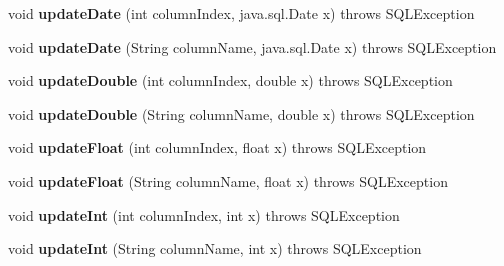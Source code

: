 \begin{DoxyCompactItemize}
void {\bfseries update\+Date} (int column\+Index, java.\+sql.\+Date x)  throws S\+Q\+L\+Exception 
\item 
\mbox{\label{classcom_1_1mysql_1_1cj_1_1jdbc_1_1result_1_1_updatable_result_set_a9d7d6087e923469e0c6c936848aedd4b}} 
void {\bfseries update\+Date} (String column\+Name, java.\+sql.\+Date x)  throws S\+Q\+L\+Exception 
\item 
\mbox{\label{classcom_1_1mysql_1_1cj_1_1jdbc_1_1result_1_1_updatable_result_set_a6f39d8f67b74278119bd6529ad3ce812}} 
void {\bfseries update\+Double} (int column\+Index, double x)  throws S\+Q\+L\+Exception 
\item 
\mbox{\label{classcom_1_1mysql_1_1cj_1_1jdbc_1_1result_1_1_updatable_result_set_aff5e97b1a01e3a852ad8bb86db540ea5}} 
void {\bfseries update\+Double} (String column\+Name, double x)  throws S\+Q\+L\+Exception 
\item 
\mbox{\label{classcom_1_1mysql_1_1cj_1_1jdbc_1_1result_1_1_updatable_result_set_a78afa9bf3b02222e126212ae37b315c7}} 
void {\bfseries update\+Float} (int column\+Index, float x)  throws S\+Q\+L\+Exception 
\item 
\mbox{\label{classcom_1_1mysql_1_1cj_1_1jdbc_1_1result_1_1_updatable_result_set_a958a7e0481c7bbe921d55a187161c5b5}} 
void {\bfseries update\+Float} (String column\+Name, float x)  throws S\+Q\+L\+Exception 
\item 
\mbox{\label{classcom_1_1mysql_1_1cj_1_1jdbc_1_1result_1_1_updatable_result_set_a65337b38cd930c9b8a5e0de9bb1e7cd6}} 
void {\bfseries update\+Int} (int column\+Index, int x)  throws S\+Q\+L\+Exception 
\item 
\mbox{\label{classcom_1_1mysql_1_1cj_1_1jdbc_1_1result_1_1_updatable_result_set_ad436bf369d85a1ddcd17a09509ce1bc8}} 
void {\bfseries update\+Int} (String column\+Name, int x)  throws S\+Q\+L\+Exception 

\end{DoxyCompactItemize}
